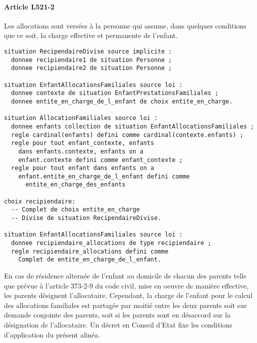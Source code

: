 \documentclass[11pt, french]{article}
\begin{document}
\paragraph{Article L521-2} Les allocations sont versées à la personne qui assume, dans quelques conditions que ce soit, la charge effective et permanente de l'enfant.
\begin{lstlisting}
situation RecipendaireDivise source implicite :
  donnee recipiendaire1 de situation Personne ;
  donnee recipiendaire2 de situation Personne ;

situation EnfantAllocationsFamiliales source loi :
  donnee contexte de situation EnfantPrestationsFamiliales ;
  donnee entite_en_charge_de_l_enfant de choix entite_en_charge.

situation AllocationFamiliales source loi :
  donnee enfants collection de situation EnfantAllocationsFamiliales ;
  regle cardinal(enfants) defini comme cardinal(contexte.enfants) ;
  regle pour tout enfant_contexte, enfants
    dans enfants.contexte, enfants on a
    enfant.contexte defini comme enfant_contexte ;
  regle pour tout enfant dans enfants on a
    enfant.entite_en_charge_de_l_enfant defini comme
      entite_en_charge_des_enfants

choix recipiendaire:
  -- Complet de choix entite_en_charge
  -- Divise de situation RecipendaireDivise.

situation EnfantAllocationsFamiliales source loi :
  donnee recipiendaire_allocations de type recipiendaire ;
  regle recipiendaire_allocations defini comme
    Complet de entite_en_charge_de_l_enfant.
\end{lstlisting}
En cas de résidence alternée de l'enfant au domicile de chacun des parents telle que prévue à l'article 373-2-9 du code civil, mise en oeuvre de manière effective, les parents désignent l'allocataire. Cependant, la charge de l'enfant pour le calcul des allocations familiales est partagée par moitié entre les deux parents soit sur demande conjointe des parents, soit si les parents sont en désaccord sur la désignation de l'allocataire. Un décret en Conseil d'Etat fixe les conditions d'application du présent alinéa.
\end{document}
